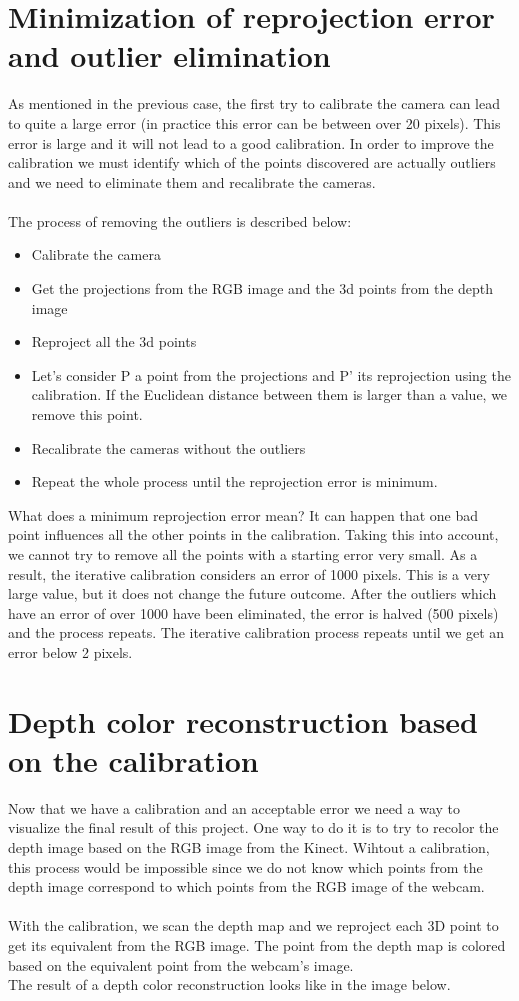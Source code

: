 \section{Minimization of reprojection error and outlier elimination}
\noindent
As mentioned in the previous case, the first try to calibrate the camera can lead to quite a large error (in practice this error can be between over 20 pixels). This error is large and it will not lead to a good calibration. In order to improve the calibration we must identify which of the points discovered are actually outliers and we need to eliminate them and recalibrate the cameras. 
\\\\
The process of removing the outliers is described below:
\begin{itemize}
	\item Calibrate the camera
	\item Get the projections from the RGB image and the 3d points from the depth image
	\item Reproject all the 3d points
	\item Let's consider P a point from the projections and P' its reprojection using the calibration. If the Euclidean distance between them is larger than a value, we remove this point.
	\item Recalibrate the cameras without the outliers
	\item Repeat the whole process until the reprojection error is minimum.
\end{itemize}

\noindent
What does a minimum reprojection error mean? It can happen that one bad point influences all the other points in the calibration. Taking this into account, we cannot try to remove all the points with a starting error very small. As a result, the iterative calibration considers an error of 1000 pixels. This is a very large value, but it does not change the future outcome. After the outliers which have an error of over 1000 have been eliminated, the error is halved (500 pixels) and the process repeats. The iterative calibration process repeats until we get an error below 2 pixels. 

\section{Depth color reconstruction based on the calibration}
\noindent
Now that we have a calibration and an acceptable error we need a way to visualize the final result of this project. One way to do it is to try to recolor the depth image based on the RGB image from the Kinect. Wihtout a calibration, this process would be impossible since we do not know which points from the depth image correspond to which points from the RGB image of the webcam.
\\\\
With the calibration, we scan the depth map and we reproject each 3D point to get its equivalent from the RGB image. The point from the depth map is colored based on the equivalent point from the webcam's image. 
\\
The result of a depth color reconstruction looks like in the image below.

